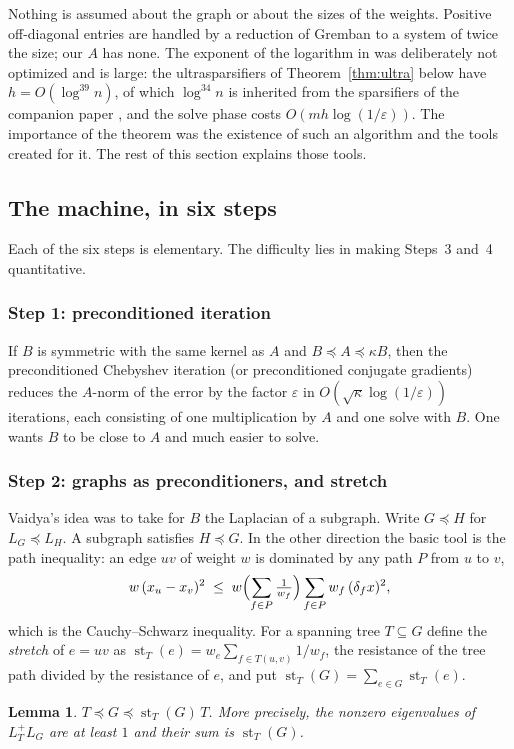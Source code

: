 \documentclass[11pt]{amsart}
\newtheorem{lemma}[theorem]{Lemma}
\theoremstyle{definition}
\theoremstyle{remark}
\newcommand{\st}{\operatorname{st}}
\newcommand{\lo}{\preccurlyeq}
\newcommand{\eps}{\varepsilon}
\begin{document}
Nothing is assumed about the graph or about the sizes of the weights. Positive off-diagonal entries are handled by a reduction of Gremban to a system of twice the size; our $A$ has none.
The exponent of the logarithm in \cite{STsolve} was deliberately not optimized and is large: the ultrasparsifiers of Theorem~\ref{thm:ultra} below have $h=O(\log^{39}n)$, of which
$\log^{34}n$ is inherited from the sparsifiers of the companion paper \cite{STspars}, and the solve phase costs $O(mh\log(1/\eps))$.
The importance of the theorem was the existence of such an algorithm and the tools created for it. The rest of this section explains those tools.

\subsection{The machine, in six steps}
Each of the six steps is elementary. The difficulty lies in making Steps~3 and~4 quantitative.

\subsubsection*{Step 1: preconditioned iteration}
If $B$ is symmetric with the same kernel as $A$ and $B\lo A\lo\kappa B$, then the preconditioned Chebyshev iteration (or preconditioned conjugate gradients) reduces the $A$-norm of the error by the factor $\eps$ in
$O(\sqrt\kappa\log(1/\eps))$ iterations, each consisting of one multiplication by $A$ and one solve with $B$. One wants $B$ to be close to $A$ and much easier to solve.

\subsubsection*{Step 2: graphs as preconditioners, and stretch}
Vaidya's idea \cite{Vai90} was to take for $B$ the Laplacian of a subgraph. Write $G\lo H$ for $L_G\lo L_H$. A subgraph satisfies $H\lo G$. In the other direction the basic tool is the
path inequality: an edge $uv$ of weight $w$ is dominated by any path $P$ from $u$ to $v$,
\[
w\,(x_u-x_v)^2\;\le\;w\Bigl(\sum_{f\in P}\tfrac1{w_f}\Bigr)\sum_{f\in P}w_f\,(\delta_fx)^2 ,
\]
which is the Cauchy--Schwarz inequality. For a spanning tree $T\subseteq G$ define the \emph{stretch} of $e=uv$ as $\st_T(e)=w_e\sum_{f\in T(u,v)}1/w_f$, the resistance of the tree path divided by the resistance of $e$, and put $\st_T(G)=\sum_{e\in G}\st_T(e)$.

\begin{lemma}\label{lem:stretch}
$T\lo G\lo\st_T(G)\,T$. More precisely, the nonzero eigenvalues of $L_T^{+}L_G$ are at least $1$ and their sum is $\st_T(G)$.
\end{lemma}
\end{document}
